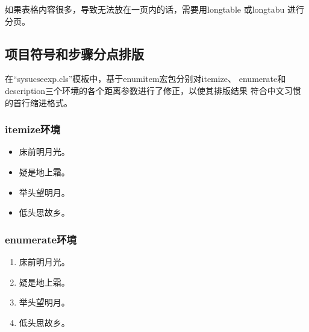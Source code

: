 \documentclass{sysucseexp}
\begin{document}
\begin{table}[!htp]
  \begin{floatrow}
  \end{floatrow}
\end{table}
如果表格内容很多，导致无法放在一页内的话，需要用{longtable} 或{longtabu} 进行分页。
\subsection{项目符号和步骤分点排版}
在\enquote{sysucseexp.cls}模板中，基于enumitem宏包分别对itemize、
enumerate和description三个环境的各个距离参数进行了修正，以使其排版结果
符合中文习惯的首行缩进格式。
\subsubsection{itemize环境}
\begin{itemize}
\item 床前明月光。
\item 疑是地上霜。
\item 举头望明月。
\item 低头思故乡。
\end{itemize}
\subsubsection{enumerate环境}
\begin{enumerate}
\item 床前明月光。
\item 疑是地上霜。
\item 举头望明月。
\item 低头思故乡。
\end{enumerate}
\end{document}
